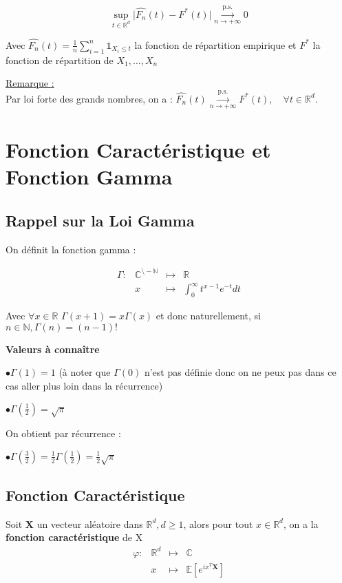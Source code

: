 \documentclass[12pt]{article}
\newcommand{\petitespace}{\vspace{0.5cm}}
\newcommand{\shift}{\hspace{2em}}
\newcommand{\bb}[1]{\mathbb{#1}} %
\newcommand{\R}{\bb{R}} %
\renewcommand{\bf}[1]{\mathbf{#1}}
\newcommand{\N}{\bb{N}}%
\newcommand{\C}{\bb{C}}%
\newcommand{\Rq}{\underline{Remarque :} \\}
\newcommand{\somme}[2]{\sum\limits_{#1}^{#2}}
\newcommand{\Sup}[1]{\sup\limits_{#1}}%
\renewcommand{\bf}[1]{\mathbf{#1}}
\newcommand{\Xunan}{X_1,\ldots,X_n} %
\newcommand{\esp}[1]{\bb{ E} \mathopen{}\left[#1\right]} %
\newcommand{\fonct}[4]{\begin{array}{rrrl} %

  #1 :& #2 &\mapsto& #3\\
  & x & \mapsto & #4 \end{array}}
\newcommand{\1}{\bb{1}} %
\newcommand{\cvn}{\underset{n\rightarrow+\infty}{\longrightarrow}} %
\newcommand{\cvps}{\overset{\text{p.s.}}{\cvn}} %
\begin{document}
$$\Sup{t \in \R^d}\lvert \widehat{F_n}(t)-F^*(t)\rvert \cvps 0$$

Avec $\widehat{F_n}(t) = \frac 1n\somme{i=1}{n}\1_{X_i \le t}$ la fonction de répartition empirique et $F^*$ la fonction de répartition de $\Xunan$

\petitespace

\Rq

Par loi forte des grands nombres, on a : $\widehat{F_n}(t)  \cvps F^*(t), \quad \forall t \in \R^d$.


\petitespace




\newpage

\section{Fonction Caractéristique et Fonction Gamma}\petitespace

\subsection{Rappel sur la Loi Gamma}\petitespace

On définit la fonction gamma :

$$\fonct{\Gamma}{\C^{\setminus -\N}}{\R}{\int_0^\infty t^{x-1}e^{-t}dt}$$

Avec  $\forall x \in \bb{R}$  $\Gamma(x+1)=x\Gamma(x)$ et donc naturellement, si $n \in \bb{N}, \Gamma(n)=(n-1)!$\petitespace


\textbf{Valeurs à connaître}\petitespace

\shift $\bullet \Gamma(1) = 1 $ (à noter que $\Gamma(0)$ n'est pas définie donc on ne peux pas dans ce cas aller plus loin dans la récurrence)\petitespace

\shift$\bullet \Gamma(\frac 12)=\sqrt \pi$\petitespace

On obtient par récurrence : \petitespace

\shift$\bullet \Gamma(\frac 32)=\frac 12 \Gamma(\frac 12) = \frac 12 \sqrt \pi$




\subsection{Fonction Caractéristique}


Soit $\bf X$ un vecteur aléatoire dans $\R^d, d \ge 1$, alors pour tout $ x \in \R^d$, on a la \textbf{fonction caractéristique} de X
$$ \fonct{\varphi}{\R^d}{\bb{C}}{\esp{e^{i x^T\bf X}}}$$
\end{document}
